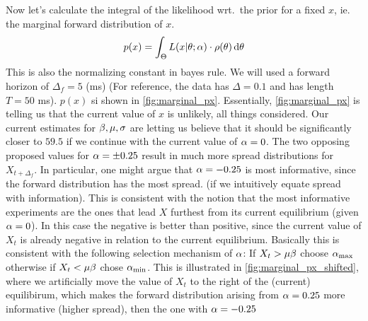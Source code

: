 \documentclass{article}
\begin{document}
Now let's calculate the integral of the likelihood wrt.\ the prior for a fixed
$x$, ie. the marginal forward distribution of $x$. $$ p(x) = \int_\Theta
L(x|{\theta};{\alpha})\cdot \rho({\theta}) \, \mathrm{d} {\theta} $$ This is also the normalizing constant
in bayes rule. We will used a forward horizon of  $\Delta_f = 5$ (ms) (For
reference, the data has $\Delta = 0.1$ and has length $T = 50$ ms). $p(x)$ si
shown in \cref{fig:marginal_px}. Essentially, \cref{fig:marginal_px} is telling
us that the current value of $x$ is unlikely, all things considered. Our current
estimates for ${\beta}, {\mu }, {\sigma }$ are letting us believe that it should be
significantly closer to $59.5$ if we continue with the current value of ${\alpha}=0$.
The two opposing proposed values for ${\alpha} = \pm 0.25$ result in much more spread
distributions for $X_{t+\Delta_f}$. In particular, one might argue that
${\alpha}=-0.25$ is most informative, since the forward distribution has the most
spread. (if we intuitively equate spread with information). This is consistent
with the notion that the most informative experiments are the ones that lead $X$
furthest from its current equilibrium (given ${\alpha}=0$). In this case the negative
is better than positive, since the current value of $X_t$ is already negative in
relation to the current equilibrium. Basically this is consistent with the
following selection mechanism of ${\alpha}$: If $X_t > {\mu } {\beta}$ choose ${ {\alpha}_{\textrm{max}} }$ otherwise
if $X_t < {\mu } {\beta}$ chose ${ {\alpha}_{\textrm{min}} }$. This is illustrated in
\cref{fig:marginal_px_shifted}, where we artificially move the value of $X_t$ to
the right of the (current) equilibirum, which makes the forward distribution
arising from ${\alpha}=0.25$ more informative (higher spread), then the one with
${\alpha}=-0.25$
\end{document}

